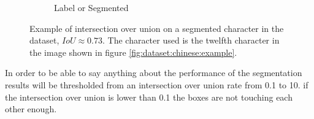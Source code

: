 \begin{figure}[ht]
\begin{subfigure}{0.24\textwidth}
    \caption{Label or Segmented}
    \label{fig:experiment:or}
  \end{subfigure}
  \caption{Example of intersection over union on a segmented character in the dataset, $IoU \approx 0.73$. The character used is the twelfth character in the image shown in figure \ref{fig:dataset:chinese:example}. }
  \label{fig:experiment:iou:example}
\end{figure}

In order to be able to say anything about the performance of the segmentation results will be thresholded from an intersection over union rate from 0.1 to 10. if the intersection over union is lower than 0.1 the boxes are not touching each other enough.


